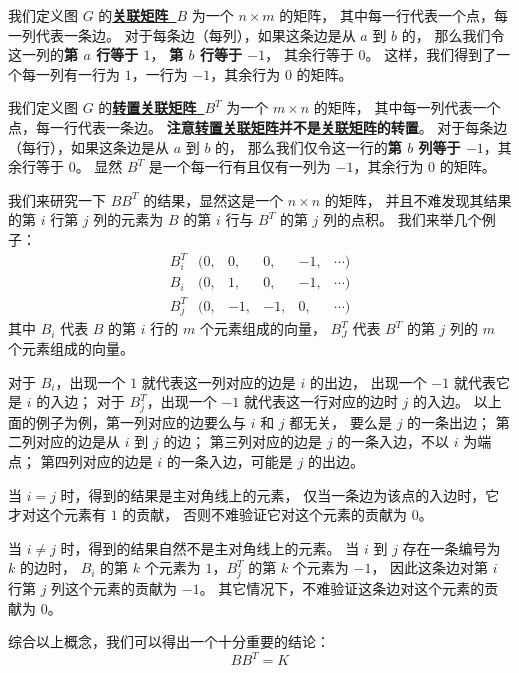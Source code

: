 \documentclass[UTF8]{article}
\begin{document}
	我们定义图 $G$ 的\textbf{\uline{关联矩阵~$B$}} 为一个 $n \times m$ 的矩阵，
	其中每一行代表一个点，每一列代表一条边。
	对于每条边（每列），如果这条边是从 $a$ 到 $b$ 的，
	那么我们令这一列的\textbf{第 $a$ 行等于 $1$}，
	\textbf{第 $b$ 行等于 $-1$}，
	其余行等于 $0$。
	这样，我们得到了一个每一列有一行为 $1$，一行为 $-1$，其余行为 $0$ 的矩阵。

	我们定义图 $G$ 的\textbf{\uline{转置关联矩阵~$B^T$}} 为一个 $m \times n$ 的矩阵，
	其中每一列代表一个点，每一行代表一条边。
	\textbf{注意\uline{转置关联矩阵}并不是\uline{关联矩阵}的转置}。
	对于每条边（每行），如果这条边是从 $a$ 到 $b$ 的，
	那么我们仅令这一行的\textbf{第 $b$ 列等于 $-1$}，其余行等于 $0$。
	显然 $B^T$ 是一个每一行有且仅有一列为 $-1$，其余行为 $0$ 的矩阵。

	我们来研究一下 $B B^T$ 的结果，显然这是一个 $n \times n$ 的矩阵，
	并且不难发现其结果的第 $i$ 行第 $j$ 列的元素为
	$B$ 的第 $i$ 行与 $B^T$ 的第 $j$ 列的点积。
	我们来举几个例子：
	\begin{equation*}
		\begin{matrix}
			B^T_i& (0,& 0,& 0,& -1,& \cdots)
			\\
			B_i& (0,& 1,& 0,& -1,& \cdots)
			\\
			B^T_j& (0,& -1,& -1,& 0,& \cdots)
		\end{matrix}
	\end{equation*}
	其中 $B_i$ 代表 $B$ 的第 $i$ 行的 $m$ 个元素组成的向量，
	$B^T_J$ 代表 $B^T$ 的第 $j$ 列的 $m$ 个元素组成的向量。

	对于 $B_i$，出现一个 $1$ 就代表这一列对应的边是 $i$ 的出边，
	出现一个 $-1$ 就代表它是 $i$ 的入边；
	对于 $B^T_j$，出现一个 $-1$ 就代表这一行对应的边时 $j$ 的入边。
	以上面的例子为例，第一列对应的边要么与 $i$ 和 $j$ 都无关，
	要么是 $j$ 的一条出边；
	第二列对应的边是从 $i$ 到 $j$ 的边；
	第三列对应的边是 $j$ 的一条入边，不以 $i$ 为端点；
	第四列对应的边是 $i$ 的一条入边，可能是 $j$ 的出边。

	当 $i = j$ 时，得到的结果是主对角线上的元素，
	仅当一条边为该点的入边时，它才对这个元素有 $1$ 的贡献，
	否则不难验证它对这个元素的贡献为 $0$。

	当 $i \ne j$ 时，得到的结果自然不是主对角线上的元素。
	当 $i$ 到 $j$ 存在一条编号为 $k$ 的边时，
	$B_i$ 的第 $k$ 个元素为 $1$，$B^T_j$ 的第 $k$ 个元素为 $-1$，
	因此这条边对第 $i$ 行第 $j$ 列这个元素的贡献为 $-1$。
	其它情况下，不难验证这条边对这个元素的贡献为 $0$。

	\bigskip

	综合以上概念，我们可以得出一个十分重要的结论：
	$$
	B B^T = K
	$$
\end{document}
